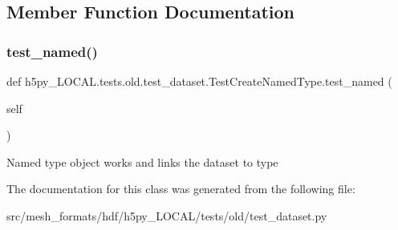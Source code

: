 \subsection{Member Function Documentation}
\mbox{\label{classh5py__LOCAL_1_1tests_1_1old_1_1test__dataset_1_1TestCreateNamedType_a49d4616fd6b93fba45adf0a6f0642a42}} 
\subsubsection{\texorpdfstring{test\+\_\+named()}{test\_named()}}
{\footnotesize\ttfamily def h5py\+\_\+\+L\+O\+C\+A\+L.\+tests.\+old.\+test\+\_\+dataset.\+Test\+Create\+Named\+Type.\+test\+\_\+named (\begin{DoxyParamCaption}\item[{}]{self }\end{DoxyParamCaption})}

\begin{DoxyVerb}Named type object works and links the dataset to type \end{DoxyVerb}
 

The documentation for this class was generated from the following file\+:\begin{DoxyCompactItemize}
\item 
src/mesh\+\_\+formats/hdf/h5py\+\_\+\+L\+O\+C\+A\+L/tests/old/test\+\_\+dataset.\+py\end{DoxyCompactItemize}

